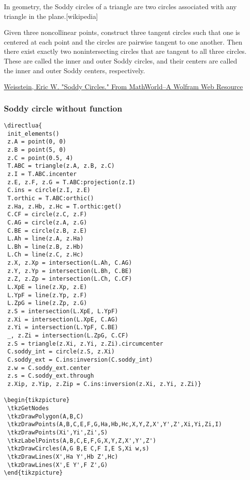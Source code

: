 In geometry, the Soddy circles of a triangle are two circles associated with any triangle in the plane.[wikipedia]

 Given three noncollinear points, construct three tangent circles such that one is centered at each point and the circles are pairwise tangent to one another. Then there exist exactly two nonintersecting circles that are tangent to all three circles. These are called the inner and outer Soddy circles, and their centers are called the inner and outer Soddy centers, respectively.
\begin{flushright}
\small
 \href{https://mathworld.wolfram.com/SoddyCircles.html}{ Weisstein, Eric W. "Soddy Circles." From MathWorld--A Wolfram Web Resource}
 \end{flushright}
 \small



\subsubsection{Soddy circle without function}

\begin{verbatim}
\directlua{
 init_elements()
 z.A = point(0, 0)
 z.B = point(5, 0)
 z.C = point(0.5, 4)
 T.ABC = triangle(z.A, z.B, z.C)
 z.I = T.ABC.incenter
 z.E, z.F, z.G = T.ABC:projection(z.I)
 C.ins = circle(z.I, z.E)
 T.orthic = T.ABC:orthic()
 z.Ha, z.Hb, z.Hc = T.orthic:get()
 C.CF = circle(z.C, z.F)
 C.AG = circle(z.A, z.G)
 C.BE = circle(z.B, z.E)
 L.Ah = line(z.A, z.Ha)
 L.Bh = line(z.B, z.Hb)
 L.Ch = line(z.C, z.Hc)
 z.X, z.Xp = intersection(L.Ah, C.AG)
 z.Y, z.Yp = intersection(L.Bh, C.BE)
 z.Z, z.Zp = intersection(L.Ch, C.CF)
 L.XpE = line(z.Xp, z.E)
 L.YpF = line(z.Yp, z.F)
 L.ZpG = line(z.Zp, z.G)
 z.S = intersection(L.XpE, L.YpF)
 z.Xi = intersection(L.XpE, C.AG)
 z.Yi = intersection(L.YpF, C.BE)
 _, z.Zi = intersection(L.ZpG, C.CF)
 z.S = triangle(z.Xi, z.Yi, z.Zi).circumcenter
 C.soddy_int = circle(z.S, z.Xi)
 C.soddy_ext = C.ins:inversion(C.soddy_int)
 z.w = C.soddy_ext.center
 z.s = C.soddy_ext.through
 z.Xip, z.Yip, z.Zip = C.ins:inversion(z.Xi, z.Yi, z.Zi)}

\begin{tikzpicture}
 \tkzGetNodes
 \tkzDrawPolygon(A,B,C)
 \tkzDrawPoints(A,B,C,E,F,G,Ha,Hb,Hc,X,Y,Z,X',Y',Z',Xi,Yi,Zi,I)
 \tkzDrawPoints(Xi',Yi',Zi',S)
 \tkzLabelPoints(A,B,C,E,F,G,X,Y,Z,X',Y',Z')
 \tkzDrawCircles(A,G B,E C,F I,E S,Xi w,s)
 \tkzDrawLines(X',Ha Y',Hb Z',Hc)
 \tkzDrawLines(X',E Y',F Z',G)
\end{tikzpicture}
\end{verbatim}

